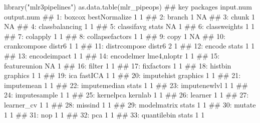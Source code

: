 \documentclass[12pt,]{scrbook}
\newenvironment{Shaded}{}{}
\newcommand{\KeywordTok}[1]{\textcolor[rgb]{0.00,0.00,1.00}{#1}}
\newcommand{\NormalTok}[1]{#1}
\newcommand{\StringTok}[1]{\textcolor[rgb]{0.00,0.50,0.50}{#1}}
\begin{document}
\begin{Shaded}
\begin{Highlighting}[]
\KeywordTok{library}\NormalTok{(}\StringTok{"mlr3pipelines"}\NormalTok{)}
\KeywordTok{as.data.table}\NormalTok{(mlr_pipeops)}
\NormalTok{##                 key      packages input.num output.num}
\NormalTok{##  1:          boxcox bestNormalize         1          1}
\NormalTok{##  2:          branch                       1         NA}
\NormalTok{##  3:           chunk                       1         NA}
\NormalTok{##  4:  classbalancing                       1          1}
\NormalTok{##  5:      classifavg         stats        NA          1}
\NormalTok{##  6:    classweights                       1          1}
\NormalTok{##  7:        colapply                       1          1}
\NormalTok{##  8: collapsefactors                       1          1}
\NormalTok{##  9:            copy                       1         NA}
\NormalTok{## 10:    crankcompose        distr6         1          1}
\NormalTok{## 11:    distrcompose        distr6         2          1}
\NormalTok{## 12:          encode         stats         1          1}
\NormalTok{## 13:    encodeimpact                       1          1}
\NormalTok{## 14:      encodelmer   lme4,nloptr         1          1}
\NormalTok{## 15:    featureunion                      NA          1}
\NormalTok{## 16:          filter                       1          1}
\NormalTok{## 17:      fixfactors                       1          1}
\NormalTok{## 18:         histbin      graphics         1          1}
\NormalTok{## 19:             ica       fastICA         1          1}
\NormalTok{## 20:      imputehist      graphics         1          1}
\NormalTok{## 21:      imputemean                       1          1}
\NormalTok{## 22:    imputemedian         stats         1          1}
\NormalTok{## 23:    imputenewlvl                       1          1}
\NormalTok{## 24:    imputesample                       1          1}
\NormalTok{## 25:       kernelpca       kernlab         1          1}
\NormalTok{## 26:         learner                       1          1}
\NormalTok{## 27:      learner_cv                       1          1}
\NormalTok{## 28:         missind                       1          1}
\NormalTok{## 29:     modelmatrix         stats         1          1}
\NormalTok{## 30:          mutate                       1          1}
\NormalTok{## 31:             nop                       1          1}
\NormalTok{## 32:             pca                       1          1}
\NormalTok{## 33:     quantilebin         stats         1          1}

\end{Highlighting}
\end{Shaded}
\end{document}
